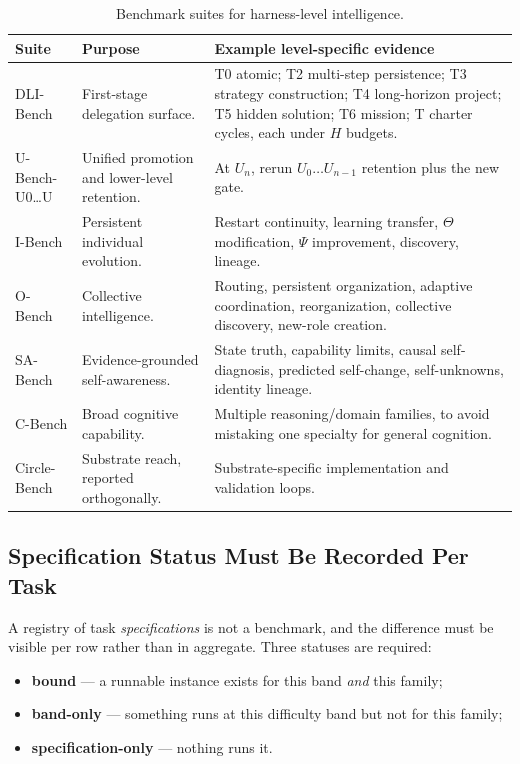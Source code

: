 \begin{table}[!htbp]
\centering\small
\begin{tabularx}{\textwidth}{@{}lYY@{}}
\toprule
Suite & Purpose & Example level-specific evidence \\
\midrule
DLI-Bench & First-stage delegation surface. & T0 atomic; T2 multi-step persistence; T3 strategy construction; T4 long-horizon project; T5 hidden solution; T6 mission; T\Om{} charter cycles, each under $H$ budgets. \\
U-Bench-U0\ldots U\Om{} & Unified promotion and lower-level retention. & At $U_n$, rerun $U_0 \ldots U_{n-1}$ retention plus the new gate. \\
I-Bench & Persistent individual evolution. & Restart continuity, learning transfer, $\Theta$ modification, $\Psi$ improvement, discovery, lineage. \\
O-Bench & Collective intelligence. & Routing, persistent organization, adaptive coordination, reorganization, collective discovery, new-role creation. \\
SA-Bench & Evidence-grounded self-awareness. & State truth, capability limits, causal self-diagnosis, predicted self-change, self-unknowns, identity lineage. \\
C-Bench & Broad cognitive capability. & Multiple reasoning/domain families, to avoid mistaking one specialty for general cognition. \\
Circle-Bench & Substrate reach, reported orthogonally. & Substrate-specific implementation and validation loops. \\
\bottomrule
\end{tabularx}
\caption{Benchmark suites for harness-level intelligence.}
\label{tab:suites}
\end{table}

\subsection{Specification Status Must Be Recorded Per Task}

A registry of task \emph{specifications} is not a benchmark, and the difference must be visible per row rather than in aggregate. Three statuses are required:

\begin{itemize}
\item \textbf{bound} --- a runnable instance exists for this band \emph{and} this family;
\item \textbf{band-only} --- something runs at this difficulty band but not for this family;
\item \textbf{specification-only} --- nothing runs it.
\end{itemize}

